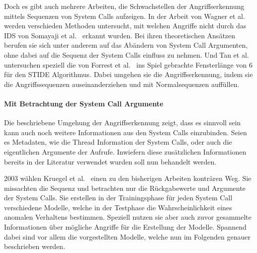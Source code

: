             Doch es gibt auch mehrere Arbeiten, die Schwachstellen der Angriffserkennung mittels Sequenzen von System Calls aufzeigen.
            In der Arbeit von Wagner et al.~\cite{Syscallseqexploit1} werden verschieden Methoden untersucht, mit welchen Angriffe nicht durch das IDS von Somayaji et al.~\cite{FORREST2000} erkannt wurden.
            Bei ihren theoretischen Ansätzen berufen sie sich unter anderem auf das Abändern von System Call Argumenten, ohne dabei auf die Sequenz der System Calls einfluss zu nehmen.
            UndTan et al.~\cite{Syscallseqexploit3} untersuchen speziell die von Forrest et al.~\cite{FORREST} ins Spiel gebrachte Fensterlänge von $6$ für den \ac{STIDE} Algorithmus.
            Dabei umgehen sie die Angriffserkennung, indem sie die Angriffssequenzen auseinanderziehen und mit Normalsequenzen auffüllen.


        \paragraph{Mit Betrachtung der System Call Argumente}\label{sec:related_sys_arg}
            Die beschriebene Umgehung der Angriffserkennung zeigt, dass es sinnvoll sein kann auch noch weitere Informationen aus den System Calls einzubinden.
            Seien es Metadaten, wie die Thread Information der System Calls, oder auch die eigentlichen Argumente der Aufrufe.
            Inwiefern diese zusätzlichen Informationen bereits in der Literatur verwendet wurden soll nun behandelt werden.\par\medskip

            2003 wählen Kruegel et al.~\cite{ARGUMENTS} einen zu den bisherigen Arbeiten konträren Weg.
            Sie missachten die Sequenz und betrachten nur die Rückgabewerte und Argumente der System Calls.
            Sie erstellen in der Trainingsphase für jeden System Call verschiedene Modelle, welche in der Testphase die Wahrscheinlichkeit eines anomalen Verhaltens bestimmen.
            Speziell nutzen sie aber auch zuvor gesammelte Informationen über mögliche Angriffe für die Erstellung der Modelle.
            Spannend dabei sind vor allem die vorgestellten Modelle, welche nun im Folgenden genauer beschrieben werden.\par\medskip

